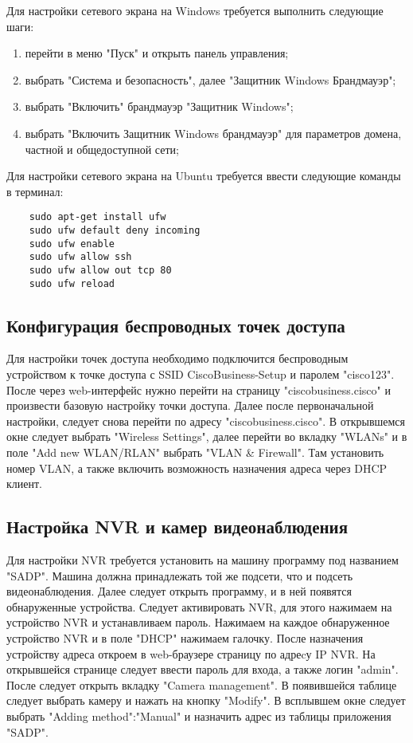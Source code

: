 Для настройки сетевого экрана на Windows требуется выполнить следующие шаги:

\begin{enumerate}
    \item перейти в меню "Пуск" и открыть панель управления;
    \item выбрать "Система и безопасность", далее "Защитник Windows Брандмауэр";
    \item выбрать "Включить" брандмауэр "Защитник Windows";
    \item выбрать "Включить Защитник Windows брандмауэр" для параметров домена, частной и общедоступной сети;
\end{enumerate}

Для настройки сетевого экрана на Ubuntu требуется ввести следующие команды в терминал:

\begin{lstlisting}
    sudo apt-get install ufw
    sudo ufw default deny incoming
    sudo ufw enable
    sudo ufw allow ssh
    sudo ufw allow out tcp 80
    sudo ufw reload
\end{lstlisting}

\subsection{Конфигурация беспроводных точек доступа}
Для настройки точек доступа необходимо подключится беспроводным устройством к точке доступа с SSID CiscoBusiness-Setup
и паролем "cisco123". После через web-интерфейс нужно перейти на страницу "ciscobusiness.cisco" и произвести базовую настройку
точки доступа. Далее после первоначальной настройки, следует снова перейти по адресу "ciscobusiness.cisco". В открывшемся окне
следует выбрать "Wireless Settings", далее перейти во вкладку "WLANs" и в поле "Add new WLAN/RLAN" выбрать "VLAN \& Firewall".
Там установить номер VLAN, а также включить возможность назначения адреса через DHCP клиент.

\subsection{Настройка NVR и камер видеонаблюдения}
Для настройки NVR требуется установить на машину программу под названием "SADP". Машина должна принадлежать той же подсети, что и подсеть видеонаблюдения.
Далее следует открыть программу, и в ней появятся обнаруженные устройства. Следует активировать NVR, для этого нажимаем на
устройство NVR и устанавливаем пароль. Нажимаем на каждое обнаруженное устройство  NVR и в поле "DHCP" нажимаем галочку.
После назначения устройству адреса откроем в web-браузере страницу по адреcу IP NVR. На открывшейся странице следует ввести пароль для входа, 
а также логин "admin". После следует открыть вкладку "Camera management". В появившейся таблице следует выбрать камеру и нажать на кнопку "Modify".
В всплывшем окне следует выбрать "Adding method":"Manual" и назначить адрес из таблицы приложения "SADP".
